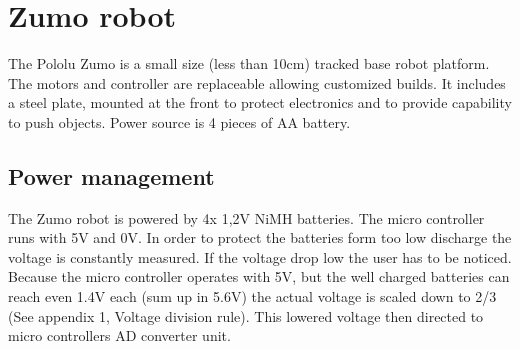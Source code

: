 \documentclass[11pt,a4paper,oneside,article]{memoir}
\begin{document}
\section{Zumo robot}
The Pololu Zumo is a small size (less than 10cm) tracked base robot platform. The motors and controller are replaceable allowing customized builds. It includes a steel plate, mounted at the front to protect electronics and to provide capability to push objects. Power source is 4 pieces of AA battery.\cite{zumo}

\subsection{Power management}
The Zumo robot is powered by 4x 1,2V NiMH batteries. The micro controller runs with 5V and 0V. In order to protect the batteries form too low discharge the voltage is constantly measured. If the voltage drop low the user has to be noticed.\\
Because the micro controller operates with 5V, but the  well charged batteries can reach even 1.4V each (sum up in 5.6V) the actual voltage is scaled down to 2/3 (See appendix 1, Voltage division rule). This lowered voltage then directed to micro controllers AD converter unit.\cite{Lectures}
\end{document}
